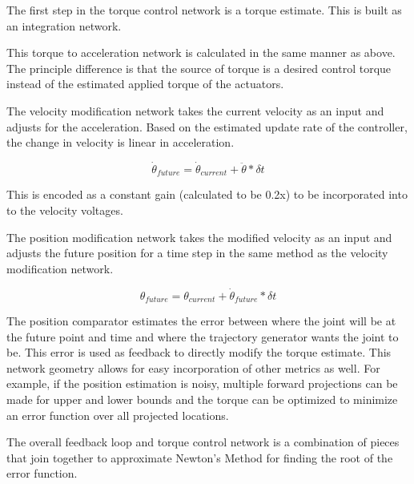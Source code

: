 The first step in the torque control network is a torque estimate. This is built
as an integration network.


This torque to acceleration network is calculated in the same manner as above.
The principle difference is that the source of torque is a desired control
torque instead of the estimated applied torque of the actuators.


The velocity modification network takes the current velocity as an input and adjusts for
the acceleration. Based on the estimated update rate of the controller, the
change in velocity is linear in acceleration.

\begin{equation}
\dot{\theta}_{future} = \dot{\theta}_{current} + \ddot{\theta} * \delta t
\end{equation}

This is encoded as a constant gain (calculated to be 0.2x) to be incorporated 
into to the velocity voltages.


The position modification network takes the modified velocity as an input and adjusts the
future position for a time step in the same method as the velocity modification
network.

\begin{equation}
\theta_{future} = \theta_{current} + \dot{\theta}_{future} * \delta t
\end{equation}



The position comparator estimates the error between where the joint will be at
the future point and time and where the trajectory generator wants the joint
to be. This error is used as feedback to directly modify the torque estimate.
This network geometry allows for easy incorporation of other metrics as well.
For example, if the position estimation is noisy, multiple forward projections
can be made for upper and lower bounds and the torque can be optimized to 
minimize an error function over all projected locations.


The overall feedback loop and torque control network is a combination of pieces
that join together to approximate
Newton's Method for finding the root of the error function.


